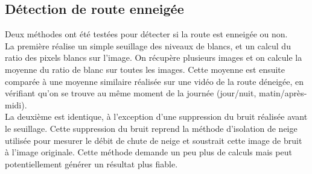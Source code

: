 \newpage

\subsection{Détection de route enneigée} \label{snowOnRoad}
Deux méthodes ont été testées pour détecter si la route est enneigée ou non.\\
La première réalise un simple seuillage des niveaux de blancs, et un calcul
du ratio des pixels blancs sur l'image. On récupère plusieurs images et on
calcule la moyenne du ratio de blanc sur toutes les images.
Cette moyenne est ensuite comparée à une moyenne similaire réalisée sur une
vidéo de la route déneigée, en vérifiant qu'on se trouve au même moment de
la journée (jour/nuit, matin/après-midi).\\
La deuxième est identique, à l'exception d'une suppression du bruit réalisée
avant le seuillage. Cette suppression du bruit reprend la méthode d'isolation
de neige utilisée pour mesurer le débit de chute de neige et soustrait cette image
de bruit à l'image originale. Cette méthode demande un peu plus de calculs mais peut
potentiellement générer un résultat plus fiable.

